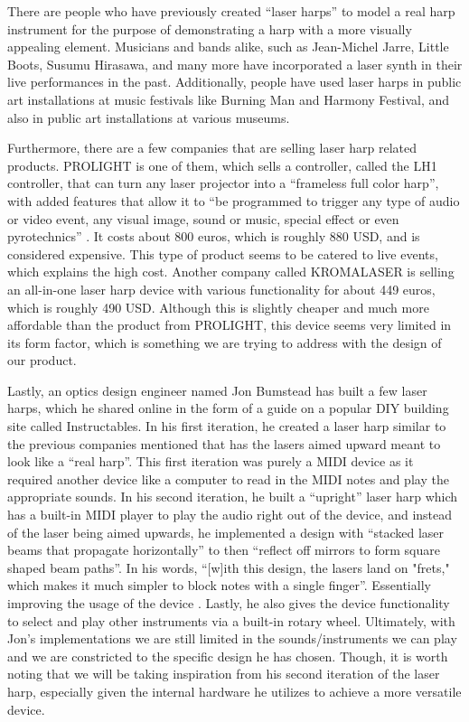 There are people who have previously created ``laser harps'' to model a real harp instrument for the purpose of demonstrating a harp with a more visually appealing element. Musicians and bands alike, such as Jean-Michel Jarre, Little Boots, Susumu Hirasawa, and many more have incorporated a laser synth in their live performances in the past. Additionally, people have used laser harps in public art installations at music festivals like Burning Man and Harmony Festival, and also in public art installations at various museums.

Furthermore, there are a few companies that are selling laser harp related products. PROLIGHT is one of them, which sells a controller, called the LH1 controller, that can turn any laser projector into a “frameless full color harp”, with added features that allow it to “be programmed to trigger any type of audio or video event, any visual image, sound or music, special effect or even pyrotechnics” \cite{PROLIGHT 2019}. It costs about 800 euros, which is roughly 880 USD, and is considered expensive. This type of product seems to be catered to live events, which explains the high cost. Another company called KROMALASER is selling an all-in-one laser harp device with various functionality for about 449 euros, which is roughly 490 USD. Although this is slightly cheaper and much more affordable than the product from PROLIGHT, this device seems very limited in its form factor, which is something we are trying to address with the design of our product.

Lastly, an optics design engineer named Jon Bumstead has built a few laser harps, which he shared online in the form of a guide on a popular DIY building site called Instructables. In his first iteration, he created a laser harp similar to the previous companies mentioned that has the lasers aimed upward meant to look like a “real harp”. This first iteration was purely a MIDI device as it required another device like a computer to read in the MIDI notes and play the appropriate sounds. In his second iteration, he built a “upright” laser harp which has a built-in MIDI player to play the audio right out of the device, and instead of the laser being aimed upwards, he implemented a design with “stacked laser beams that propagate horizontally” to then “reflect off mirrors to form square shaped beam paths”. In his words, “[w]ith this design, the lasers land on "frets," which makes it much simpler to block notes with a single finger”. Essentially improving the usage of the device \cite{Bumstead2019}. Lastly, he also gives the device functionality to select and play other instruments via a built-in rotary wheel. Ultimately, with Jon’s implementations we are still limited in the sounds/instruments we can play and we are constricted to the specific design he has chosen. Though, it is worth noting that we will be taking inspiration from his second iteration of the laser harp, especially given the internal hardware he utilizes to achieve a more versatile device.

